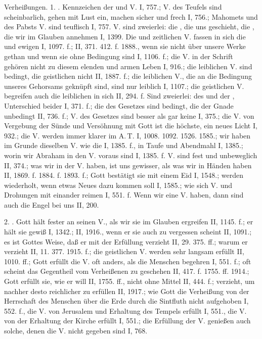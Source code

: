 Verheißungen. 1. . Kennzeichen der  und  V. I, 757.; V. des Teufels sind scheinbarlich, gehen mit Lust ein, machen sicher und frech I, 756.; Mahomets und des Pabsts V. sind teuflisch I, 757. V. sind zweierlei: die , die uns geschieht, die , die wir im Glauben annehmen I, 1399. Die  und zeitlichen V. fassen in sich die  und ewigen I, 1097. f.; II, 371. 412. f. 1888., wenn sie nicht über unsere Werke gethan und wenn sie ohne Bedingung sind I, 1106. f.; die V. in der Schrift gehören nicht zu diesem elenden und armen Leben I, 916.; die leiblichen V. sind bedingt, die geistlichen nicht II, 1887. f.; die leiblichen V., die an die Bedingung unseres Gehorsams geknüpft sind, sind nur leiblich I, 1107.; die geistlichen V. begreifen auch die leiblichen in sich II, 294. f. Sind zweierlei: des  und der , Unterschied beider I, 371. f.; die des Gesetzes sind bedingt, die der Gnade unbedingt II, 736. f.; V. des Gesetzes sind besser als gar keine I, 375.; die V. von Vergebung der Sünde und Versöhnung mit Gott ist die höchste, ein neues Licht I, 932.; die V.  werden immer klarer im A.\,T. I, 1008. 1092. 1526. 1585.; wir haben im Grunde dieselben V. wie die  I, 1385. f., in Taufe und Abendmahl I, 1385.; worin wir Abraham in den V. voraus sind I, 1385. f. V. sind fest und unbeweglich II, 374.; was wir in der V. haben, ist uns gewisser, als was wir in Händen haben II, 1869. f. 1884. f. 1893. f.; Gott bestätigt sie mit einem Eid I, 1548.; werden wiederholt, wenn etwas Neues dazu kommen soll I, 1585.; wie sich V. und Drohungen mit einander reimen I, 551. f. Wenn wir eine V. haben, dann sind auch die Engel bei uns II, 200.

2. . Gott hält fester an seinen V., als wir sie im Glauben ergreifen II, 1145. f.; er hält sie gewiß I, 1342.; II, 1916., wenn er sie auch zu vergessen scheint II, 1091.; es ist Gottes Weise, daß er mit der Erfüllung verzieht II, 29. 375. ff.; warum er verzieht II, 11. 377. 1915. f.; die geistlichen V. werden sehr langsam erfüllt II, 1010. ff.; Gott erfüllt die V. oft anders, als die Menschen begehren I, 551. f.; oft scheint das Gegentheil vom Verheißenen zu geschehen II, 417. f. 1755. ff. 1914.; Gott erfüllt sie, wie er will II, 1755. ff., nicht ohne Mittel II, 444. f.; verzieht, um nachher desto reichlicher zu erfüllen II, 1917.; wie Gott die Verheißung von der Herrschaft des Menschen über die Erde durch die Sintfluth nicht aufgehoben I, 552. f., die V. von Jerusalem und Erhaltung des Tempels erfüllt I, 551., die V. von der Erhaltung der Kirche erfüllt I, 551.; die Erfüllung der V. genießen auch solche, denen die V. nicht gegeben sind I, 768.

